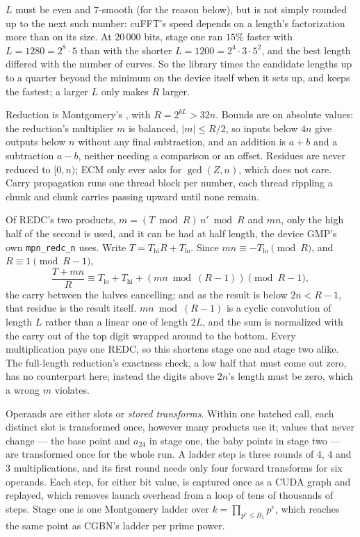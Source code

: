 \documentclass[11pt,a4paper]{article}
\newcommand{\code}[1]{\texttt{#1}}
\begin{document}
$L$ must be even and $7$-smooth (for the reason below), but is not simply rounded up to the
next such number: cuFFT's speed depends on a length's factorization more than on its size. At
$20\,000$ bits, stage one ran $15\%$ faster with $L = 1280 = 2^8 \cdot 5$ than with the
shorter $L = 1200 = 2^4 \cdot 3 \cdot 5^2$, and the best length differed with the number of
curves. So the library times the candidate lengths up to a quarter beyond the minimum on the
device itself when it sets up, and keeps the fastest; a larger $L$ only makes $R$ larger.

Reduction is Montgomery's \cite{montgomery1985}, with $R = 2^{bL} > 32n$. Bounds are on
absolute values: the reduction's multiplier $m$ is balanced, $|m| \le R/2$, so inputs below $4n$
give outputs below $n$ without any final subtraction, and an addition is $a + b$ and a
subtraction $a - b$, neither needing a comparison or an offset. Residues are never reduced to
$[0, n)$; ECM only ever asks for $\gcd(Z, n)$, which does not care. Carry
propagation runs one thread block per number, each thread rippling a chunk and chunk carries
passing upward until none remain.

Of REDC's two products, $m = (T \bmod R)\,n' \bmod R$ and $mn$, only the high half of the
second is used, and it can be had at half length, the device GMP's own \code{mpn\_redc\_n}
uses. Write $T = T_{\mathrm{hi}}R + T_{\mathrm{lo}}$. Since $mn \equiv -T_{\mathrm{lo}}
\pmod R$, and $R \equiv 1 \pmod{R - 1}$,
\[
\frac{T + mn}{R} \equiv T_{\mathrm{lo}} + T_{\mathrm{hi}} + (mn \bmod (R - 1))
\pmod{R - 1},
\]
the carry between the halves cancelling; and as the result is below $2n < R - 1$, that residue
is the result itself. $mn \bmod (R - 1)$ is a cyclic convolution of length $L$ rather than a
linear one of length $2L$, and the sum is normalized with the carry out of the top digit wrapped
around to the bottom. Every multiplication pays one REDC, so this shortens stage one and stage
two alike. The full-length reduction's exactness check, a low half that must come out zero, has
no counterpart here; instead the digits above $2n$'s length must be zero, which a wrong $m$
violates.

Operands are either slots or \emph{stored transforms}. Within one batched call, each distinct
slot is transformed once, however many products use it; values that never change --- the base
point and $a_{24}$ in stage one, the baby points in stage two --- are transformed once for the
whole run. A ladder step is three rounds of $4$, $4$ and $3$ multiplications, and its first
round needs only four forward transforms for six operands. Each step, for either bit value, is
captured once as a CUDA graph and replayed, which removes launch overhead from a loop of tens of
thousands of steps. Stage one is one Montgomery ladder over $k = \prod_{p^e \le B_1} p^e$, which
reaches the same point as CGBN's ladder per prime power.
\end{document}

